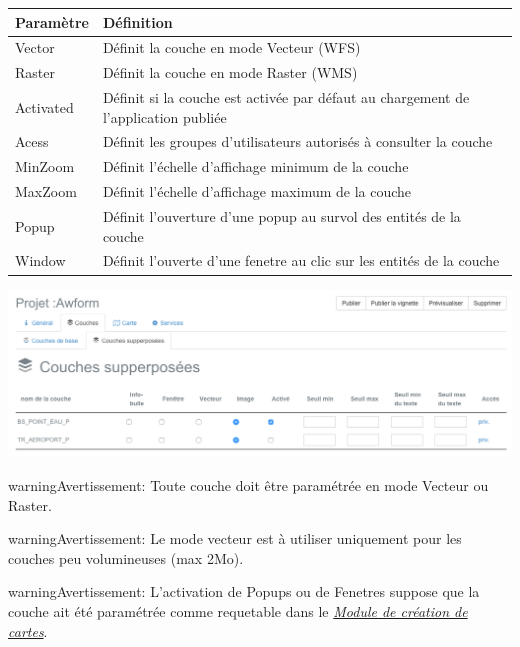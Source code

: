 \documentclass[letterpaper,10pt,french]{sphinxmanual}
\begin{document}
\begin{tabulary}{\linewidth}{|L|L|}
\hline

\textbf{Paramètre}
 & 
\textbf{Définition}
\\
\hline
Vector
 & 
Définit la couche en mode Vecteur (WFS)
\\
\hline
Raster
 & 
Définit la couche en mode Raster (WMS)
\\
\hline
Activated
 & 
Définit si la couche est activée par défaut au chargement de l'application publiée
\\
\hline
Acess
 & 
Définit les groupes d'utilisateurs autorisés à consulter la couche
\\
\hline
MinZoom
 & 
Définit l'échelle d'affichage minimum de la couche
\\
\hline
MaxZoom
 & 
Définit l'échelle d'affichage maximum de la couche
\\
\hline
Popup
 & 
Définit l'ouverture d'une popup au survol des entités de la couche
\\
\hline
Window
 & 
Définit l'ouverte d'une fenetre au clic sur les entités de la couche
\\
\hline\end{tabulary}


\includegraphics[width=1.000\linewidth]{publisher-overlays-conf.png}

\begin{notice}{warning}{Avertissement:}
Toute couche doit être paramétrée en mode Vecteur ou Raster.
\end{notice}

\begin{notice}{warning}{Avertissement:}
Le mode vecteur est à utiliser uniquement pour les couches peu volumineuses (max 2Mo).
\end{notice}

\begin{notice}{warning}{Avertissement:}
L'activation de Popups ou de Fenetres suppose que la couche ait été paramétrée comme requetable dans le {\hyperref[maps/index::doc]{\emph{\emph{Module de création de cartes}}}}.
\end{notice}
\end{document}
